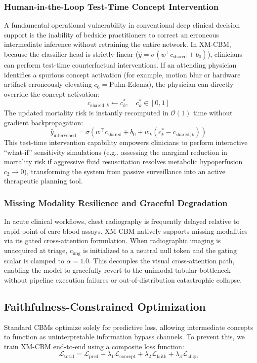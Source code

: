 \documentclass[10pt,journal,compsoc,twocolumn]{IEEEtran}
\begin{document}
\subsubsection{Human-in-the-Loop Test-Time Concept Intervention}
A fundamental operational vulnerability in conventional deep clinical decision support is the inability of bedside practitioners to correct an erroneous intermediate inference without retraining the entire network. In XM-CBM, because the classifier head is strictly linear ($\hat{y} = \sigma(w^\top c_{\text{shared}} + b_0)$), clinicians can perform test-time counterfactual interventions. If an attending physician identifies a spurious concept activation (for example, motion blur or hardware artifact erroneously elevating $c_6 = \text{Pulm-Edema}$), the physician can directly override the concept activation:
\begin{equation}
    c_{\text{shared}, k} \leftarrow c_k^\ast, \quad c_k^\ast \in [0, 1]
\end{equation}
The updated mortality risk is instantly recomputed in $\mathcal{O}(1)$ time without gradient backpropagation:
\begin{equation}
    \hat{y}_{\text{intervened}} = \sigma\left(w^\top c_{\text{shared}} + b_0 + w_k(c_k^\ast - c_{\text{shared}, k})\right)
\end{equation}
This test-time intervention capability empowers clinicians to perform interactive ``what-if'' sensitivity simulations (e.g., assessing the marginal reduction in mortality risk if aggressive fluid resuscitation resolves metabolic hypoperfusion $c_2 \to 0$), transforming the system from passive surveillance into an active therapeutic planning tool.

\subsubsection{Missing Modality Resilience and Graceful Degradation}
In acute clinical workflows, chest radiography is frequently delayed relative to rapid point-of-care blood assays. XM-CBM natively supports missing modalities via its gated cross-attention formulation. When radiographic imaging is unacquired at triage, $c_{\text{img}}$ is initialized to a neutral null token and the gating scalar is clamped to $\alpha = 1.0$. This decouples the visual cross-attention path, enabling the model to gracefully revert to the unimodal tabular bottleneck without pipeline execution failures or out-of-distribution catastrophic collapse.

\subsection{Faithfulness-Constrained Optimization}
Standard CBMs optimize solely for predictive loss, allowing intermediate concepts to function as uninterpretable information bypass channels. To prevent this, we train XM-CBM end-to-end using a composite loss function:
\begin{equation}
    \mathcal{L}_{\text{total}} = \mathcal{L}_{\text{pred}} + \lambda_1 \mathcal{L}_{\text{concept}} + \lambda_2 \mathcal{L}_{\text{faith}} + \lambda_3 \mathcal{L}_{\text{align}}
\end{equation}
\end{document}

